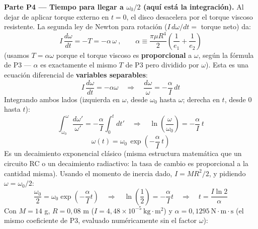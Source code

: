 \documentclass[11pt]{article}
\begin{document}
\textbf{Parte P4 --- Tiempo para llegar a $\omega_0/2$ (aqu\'i est\'a la integraci\'on).}
Al dejar de aplicar torque externo en $t=0$, el disco desacelera por el torque viscoso
resistente. La segunda ley de Newton para rotaci\'on ($I\,d\omega/dt=$ torque neto) da:
\begin{equation}
I\,\frac{d\omega}{dt}=-T=-\alpha\,\omega
\ ,\qquad
\alpha\equiv\frac{\pi\mu R^4}{2}\left(\frac1{e_1}+\frac1{e_2}\right)
\end{equation}
(usamos $T=\alpha\omega$ porque el torque viscoso es \textbf{proporcional} a $\omega$,
seg\'un la f\'ormula de P3 --- $\alpha$ es exactamente el mismo $T$ de P3 pero dividido
por $\omega$). Esta es una ecuaci\'on diferencial de \textbf{variables separables}:
\begin{equation}
I\,\frac{d\omega}{dt}=-\alpha\omega
\quad\Longrightarrow\quad
\frac{d\omega}{\omega}=-\frac{\alpha}{I}\,dt
\end{equation}
Integrando ambos lados (izquierda en $\omega$, desde $\omega_0$ hasta $\omega$; derecha
en $t$, desde $0$ hasta $t$):
\begin{equation}
\int_{\omega_0}^{\omega}\frac{d\omega'}{\omega'}=-\frac{\alpha}{I}\int_0^t dt'
\quad\Longrightarrow\quad
\ln\left(\frac{\omega}{\omega_0}\right)=-\frac{\alpha}{I}\,t
\end{equation}
\begin{equation}
\boxed{\omega(t)=\omega_0\,\exp\!\left(-\frac{\alpha}{I}\,t\right)}
\end{equation}
Es un decaimiento exponencial cl\'asico (misma estructura matem\'atica que un circuito
RC o un decaimiento radiactivo: la tasa de cambio es proporcional a la cantidad misma).
Usando el momento de inercia dado, $I=MR^2/2$, y pidiendo $\omega=\omega_0/2$:
\begin{equation}
\frac{\omega_0}{2}=\omega_0\exp\!\left(-\frac{\alpha}{I}t\right)
\quad\Longrightarrow\quad
\ln\!\left(\frac12\right)=-\frac{\alpha}{I}t
\quad\Longrightarrow\quad
\boxed{t=\frac{I\ln2}{\alpha}}
\end{equation}
Con $M=14$ g, $R=0{,}08$ m ($I=4{,}48\times10^{-5}\ \text{kg}\cdot\text{m}^2$) y
$\alpha=0{,}1295\ \text{N}\cdot\text{m}\cdot\text{s}$ (el mismo coeficiente de P3,
evaluado num\'ericamente sin el factor $\omega$):
\begin{center}
\end{center}

\newpage
{}
\end{document}
